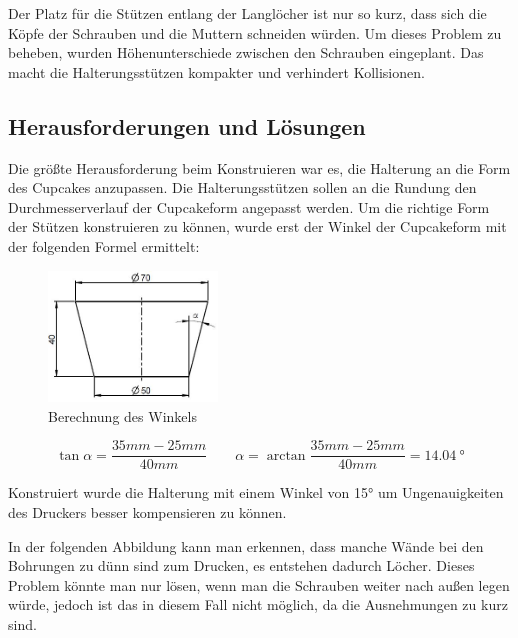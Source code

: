 	Der Platz für die Stützen entlang der Langlöcher ist nur so kurz, dass sich die Köpfe der Schrauben und die Muttern schneiden würden.
	Um dieses Problem zu beheben, wurden Höhenunterschiede zwischen den Schrauben eingeplant.
	Das macht die Halterungsstützen kompakter und verhindert Kollisionen.

			\newpage

	\subsection{Herausforderungen und Lösungen}

	Die größte Herausforderung beim Konstruieren war es, die Halterung an die Form des Cupcakes anzupassen.
	Die Halterungsstützen sollen an die Rundung \bzw den Durchmesserverlauf der Cupcakeform angepasst werden.
	Um die richtige Form der Stützen konstruieren zu können, wurde erst der Winkel der Cupcakeform mit der  folgenden Formel ermittelt:

			\begin{figure}[H]
			\begin{centering}
			\includegraphics[width = 0.4\textwidth]{Bilder/berechnung_winkel}
			\par\end{centering}
			\caption{Berechnung des Winkels}
			\label{berechnung_winkel}
			\end{figure}

			\[
 				\tan \alpha = \frac{35mm-25mm}{40mm}  \qquad \alpha = \arctan \frac{35mm-25mm}{40mm} = \SI{14.04}{\degree}
 			\]

	Konstruiert wurde die Halterung mit einem Winkel von 15° um Ungenauigkeiten des Druckers besser kompensieren zu können.

	In der folgenden Abbildung kann man erkennen, dass manche Wände bei den Bohrungen zu dünn sind zum Drucken, es entstehen dadurch Löcher.
	Dieses Problem könnte man nur lösen, wenn man die Schrauben weiter nach außen legen würde, jedoch ist das in diesem Fall nicht möglich, da die Ausnehmungen zu kurz sind.


